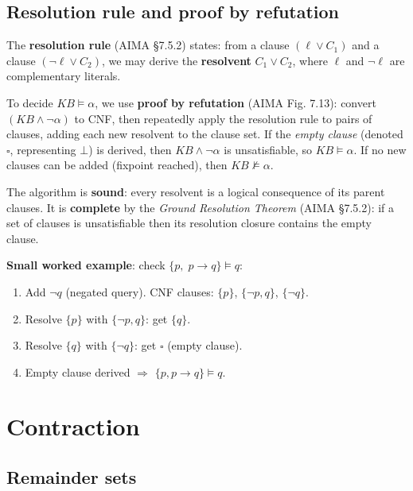 \documentclass[11pt,a4paper]{article}
\newcommand{\entails}{\models}
\newcommand{\nentails}{\not\models}
\newcommand{\lneg}{\neg}
\begin{document}
\subsection{Resolution rule and proof by refutation}

The \textbf{resolution rule} (AIMA §7.5.2) states: from a clause
$(\ell \lor C_1)$ and a clause $(\lneg\ell \lor C_2)$, we may derive the
\textbf{resolvent} $C_1 \lor C_2$, where $\ell$ and $\lneg\ell$ are
complementary literals.

To decide $\mathit{KB} \entails \alpha$, we use \textbf{proof by refutation}
(AIMA Fig. 7.13):
convert $(\mathit{KB} \land \lneg\alpha)$ to CNF,
then repeatedly apply the resolution rule to pairs of clauses,
adding each new resolvent to the clause set.
If the \emph{empty clause} (denoted $\square$, representing $\bot$) is derived,
then $\mathit{KB} \land \lneg\alpha$ is unsatisfiable, so $\mathit{KB} \entails \alpha$.
If no new clauses can be added (fixpoint reached), then $\mathit{KB} \nentails \alpha$.

The algorithm is \textbf{sound}: every resolvent is a logical consequence of
its parent clauses.
It is \textbf{complete} by the \emph{Ground Resolution Theorem} (AIMA §7.5.2):
if a set of clauses is unsatisfiable then its resolution closure contains the
empty clause.

\textbf{Small worked example}: check $\{p,\; p \to q\} \entails q$:
\begin{enumerate}[noitemsep]
  \item Add $\lneg q$ (negated query).  CNF clauses: $\{p\}$, $\{\lneg p, q\}$, $\{\lneg q\}$.
  \item Resolve $\{p\}$ with $\{\lneg p, q\}$: get $\{q\}$.
  \item Resolve $\{q\}$ with $\{\lneg q\}$: get $\square$ (empty clause).
  \item Empty clause derived $\Rightarrow$ $\{p, p\to q\} \entails q$. \quad\checkmark
\end{enumerate}

\section{Contraction}

\subsection{Remainder sets}
\end{document}
